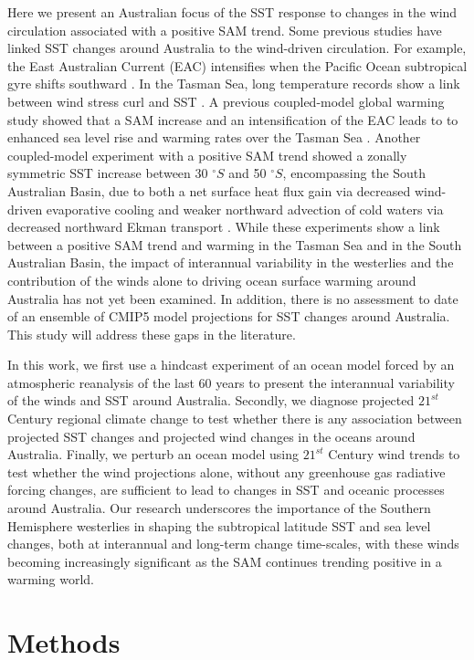 \documentclass[draft,linenumbers]{agujournal2018}
\begin{document}
Here we present an Australian focus of the SST response to changes in the wind circulation associated with a positive SAM trend. Some previous studies have linked SST changes around Australia to the wind-driven circulation. For example, the East Australian Current (EAC) intensifies when the Pacific Ocean subtropical gyre shifts southward \citep{Hill2011}. In the Tasman Sea, long temperature records show a link between wind stress curl and SST \citep{Hill2008,Shears2017}. A previous coupled-model global warming study showed that a SAM increase and an intensification of the EAC leads to to enhanced sea level rise and warming rates over the Tasman Sea \citep{Cai2005}. Another coupled-model experiment with a positive SAM trend showed a zonally symmetric SST increase between 30 $^{\circ}S$ and 50 $^{\circ}S$, encompassing the South Australian Basin, due to both a net surface heat flux gain via decreased wind-driven evaporative cooling and weaker northward advection of cold waters via decreased northward Ekman transport \citep{SenGupta2006}. While these experiments show a link between a positive SAM trend and warming in the Tasman Sea and in the South Australian Basin, the impact of interannual variability in the westerlies and the contribution of the winds alone to driving ocean surface warming around Australia has not yet been examined. In addition, there is no assessment to date of an ensemble of CMIP5 model projections for SST changes around Australia. This study will address these gaps in the literature.

In this work, we first use a hindcast experiment of an ocean model forced by an atmospheric reanalysis of the last 60 years to present the interannual variability of the winds and SST around Australia. Secondly, we diagnose projected $21^{st}$ Century regional climate change to test whether there is any association between projected SST changes and projected wind changes in the oceans around Australia. Finally, we perturb an ocean model using $21^{st}$ Century wind trends to test whether the wind projections alone, without any greenhouse gas radiative forcing changes, are sufficient to lead to changes in SST and oceanic processes around Australia. Our research underscores the importance of the Southern Hemisphere westerlies in shaping the subtropical latitude SST and sea level changes, both at interannual and long-term change time-scales, with these winds becoming increasingly significant as the SAM continues trending positive in a warming world.

\section{Methods}
\end{document}
